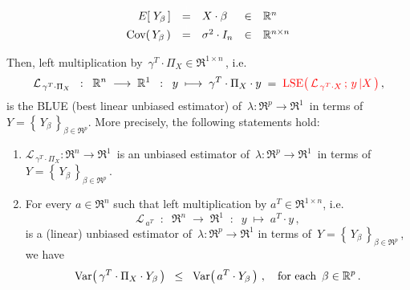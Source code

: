 \begin{theorem}
\begin{itemize}
	\begin{equation*}
	\begin{array}{rclcl}
	E\!\left[\;Y_{\beta}\,\right] &  \overset{{\color{white}\vert}}{=} & X \cdot \beta & \in & \Re^{n}
	\\
	\Cov\!\left(\,Y_{\beta}\,\right) & \overset{{\color{white}\vert}}{=} & \sigma^{2} \cdot I_{n} & \in & \Re^{n \times n}
	\end{array}
	\end{equation*}
\end{itemize}
Then, left multiplication by \,$\gamma^{T} \cdot \Pi_{X} \in \Re^{1 \times n}$\,, i.e.
\begin{equation*}
\mathcal{L}_{\,\gamma^{T} \cdot \Pi_{X}}
\;\; : \;\;
\mathbb{R}^{n} \; \longrightarrow \; \mathbb{R}^{1}
\;\; : \;\;
y \; \longmapsto \; \gamma^{T} \cdot \Pi_{X} \cdot y
\;=\; {\color{red}\textnormal{LSE}\!\left(\,\mathcal{L}_{\,\gamma^{T} \cdot X}\,;\,y\,\vert X\,\right)}\,,
\end{equation*}
is the {\color{red}BLUE} (best linear unbiased estimator) of
\,$\lambda : \Re^{p} \longrightarrow \Re^{1}$\,
in terms of \,$Y = \left\{\,Y_{\beta}\,\right\}_{\beta\in\Re^{p}}$.
More precisely, the following statements hold:
\begin{enumerate}
\item
	$\mathcal{L}_{\,\gamma^{T} \cdot \Pi_{X}} : \Re^{n} \longrightarrow \Re^{1}$\,
	is an unbiased estimator of \,$\lambda : \Re^{p} \longrightarrow \Re^{1}$\,
	in terms of \,$Y = \left\{\,Y_{\beta}\,\right\}_{\beta\in\Re^{p}}$\,.
\item
	For every $a \in \Re^{n}$ such that left multiplication by $a^{T} \in \Re^{1 \times n}$, i.e.
	\begin{equation*}
	\mathcal{L}_{\,a^{T}}
	\;\; : \;\;
		\Re^{n} \; \longrightarrow \; \Re^{1}
	\;\; : \;\;
		y \; \longmapsto \; a^{T} \cdot y\,,
	\end{equation*}
	is a (linear) unbiased estimator of
	\,$\lambda : \Re^{p} \longrightarrow \Re^{1}$
	in terms of \,$Y = \left\{\,Y_{\beta}\,\right\}_{\beta\in\Re^{p}}$\,, we have
	\begin{equation*}
	\textnormal{Var}\!\left(\,\gamma^{T} \cdot \Pi_{X} \cdot Y_{\beta}\,\right)
	\;\; \leq \;\;
		\textnormal{Var}\!\left(\,a^{T} \cdot Y_{\beta}\,\right)\,,
	\quad
	\textnormal{for each \,$\beta \in \mathbb{R}^{p}$}\,.
	\end{equation*}
\end{enumerate}
\end{theorem}
\proof
